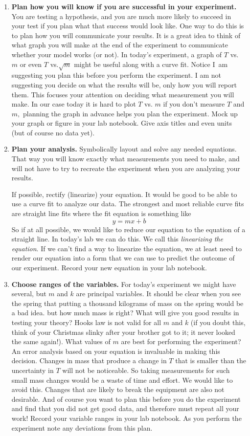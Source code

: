 \documentclass[twoside,11pt,ShortChapTitles]{BYUTextbook}
\begin{document}
\begin{enumerate}
\item {\bf Plan how you will know if you are successful in your experiment.} You are
testing a hypothesis, and you are much more likely to succeed in your test if
you plan what that success would look like. One way to do this is to plan how
you will communicate your results. It is a great idea to think of what graph
you will make at the end of the experiment to communicate whether your model
works (or not). In today's experiment, a graph of $T$ vs. $m$ or even $T$
vs.$\sqrt{m}$ might be useful along with a curve fit. Notice I\ am suggesting
you plan this before you perform the experiment. I am not suggesting you
decide on what the results will be, only how you will report them. This
focuses your attention on deciding what measurement you will make. In our case
today it is hard to plot $T$ vs. $m$ if you don't measure $T$ and $m,$
planning the graph in advance helps you plan the experiment. Mock up your
graph or figure in your lab notebook. Give axis titles and even units (but of
course no data yet).

\item {\bf Plan your analysis.}  Symbolically layout and solve any needed equations.  That way you will know exactly what measurements you need to make, and will not have to try to recreate the experiment when you are analyzing your results.

If possible, rectify (linearize) your equation. It would be good to be able to use a curve fit to
analyze our data. The strongest and most reliable curve fits are straight line
fits where the fit equation is something like
\[
y=mx+b
\]
So if at all possible, we would like to reduce our equation to the equation of
a straight line. In today's lab we can do this. We call this \emph{linearizing
the equation}. If we can't find a way to linearize the equation, we at least
need to render our equation into a form that we can use to predict the outcome
of our experiment. Record your new equation in your lab notebook.

\item {\bf Choose ranges of the variables.} For today's experiment we might have
several, but $m$ and $k$ are principal variables. It should be clear when you
see the spring that putting a thousand kilograms of mass on the spring would
be a bad idea. but how much mass is right? What will give you good results in
testing your theory? Hooks law is not valid for all $m$ and $k$ (if you doubt
this, think of your Christmas slinky after your brother got to it; it never
looked the same again!). What values of $m$ are best for performing the
experiment? An error analysis based on your equation is invaluable in making
this decision. Changes in mass that produce a change in $T$ that is smaller
than the uncertainty in $T$ will not be noticeable. So taking measurements for
such small mass changes would be a waste of time and effort. We would like to
avoid this. Changes that are likely to break the equipment are also not
desirable. And of course you want to plan this before you do the experiment
and find that you did not get good data, and therefore must repeat all your
work! Record your variable ranges in your lab notebook. As you perform the
experiment note any deviations from this plan.


\end{enumerate}
\end{document}

